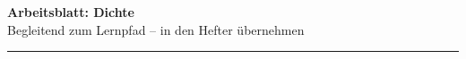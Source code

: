 \documentclass[10pt, a4paper]{article}
\newcommand{\thema}{Dichte}
\begin{document}


\begin{center}
{\large\bfseries Arbeitsblatt: \thema}\\[2pt]
{\small\textcolor{grau}{Begleitend zum Lernpfad -- in den Hefter übernehmen}}
\end{center}

\vspace{-2pt}
\hrule
\vspace{8pt}

\end{document}
